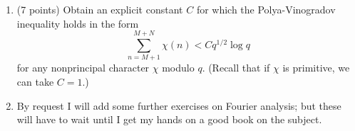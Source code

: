 \documentclass[12pt]{article}
\begin{document}
\begin{enumerate}
\item (7 points)
Obtain an explicit constant $C$ for which the Polya-Vinogradov inequality holds in the
form
$$\sum_{n = M + 1}^{M + N} \chi(n) < C q^{1/2} \log q$$
for any nonprincipal character $\chi$ modulo $q$. (Recall that if $\chi$ is primitive,
we can take $C = 1$.)

\item
By request I will add some further exercises on Fourier analysis; but these will have
to wait until I get my hands on a good book on the subject.

\end{enumerate}
\end{document}

